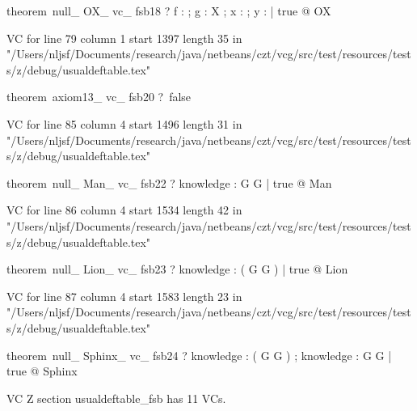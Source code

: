 \documentclass{article}
\begin{document}
\begin{zed}theorem~null\_ OX\_ vc\_ fsb18 \vdash ? \forall f : \nat \fun \nat ; g : X ; x : \nat ; y : \power \nat | true @ \pre OX
\end{zed}
VC for line 79 column 1 start 1397 length 35 in "/Users/nljsf/Documents/research/java/netbeans/czt/vcg/src/test/resources/tests/z/debug/usualdeftable.tex"
\begin{zed}theorem~axiom13\_ vc\_ fsb20 \vdash ?~false
\end{zed}
VC for line 85 column 4 start 1496 length 31 in "/Users/nljsf/Documents/research/java/netbeans/czt/vcg/src/test/resources/tests/z/debug/usualdeftable.tex"
\begin{zed}theorem~null\_ Man\_ vc\_ fsb22 \vdash ? \forall knowledge : G \fun G | true @ \pre Man
\end{zed}
VC for line 86 column 4 start 1534 length 42 in "/Users/nljsf/Documents/research/java/netbeans/czt/vcg/src/test/resources/tests/z/debug/usualdeftable.tex"
\begin{zed}theorem~null\_ Lion\_ vc\_ fsb23 \vdash ? \forall knowledge : \power ( G \cross G ) | true @ \pre Lion
\end{zed}
VC for line 87 column 4 start 1583 length 23 in "/Users/nljsf/Documents/research/java/netbeans/czt/vcg/src/test/resources/tests/z/debug/usualdeftable.tex"
\begin{zed}theorem~null\_ Sphinx\_ vc\_ fsb24 \vdash ? \forall knowledge : \power ( G \cross G ) ; knowledge : G \fun G | true @ \pre Sphinx
\end{zed}


 VC Z section usualdeftable_fsb has 11 VCs.



\end{document}
